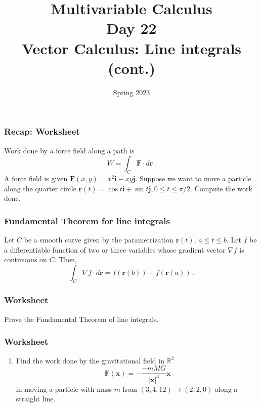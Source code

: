 \documentclass[aspectratio=169]{beamer}
\title{ Multivariable Calculus \\ Day  22 \\ Vector Calculus: Line integrals (cont.)}
\date{Spring 2023}
\newcommand{\vect}{\mathbf}
\newcommand{\R}{\mathbb{R}}
\begin{document}
\maketitle


\begin{frame}
    \frametitle{Recap: Worksheet}
    Work done by a force field along a path is 
    \begin{equation*}
        W = \int_C  \vect{F} \cdot d\vect{r} \,.
    \end{equation*}
    A force field is given $\vect{F}(x,y) = x^2 \vect{i} - xy \vect{j}$.
    Suppose we want to move a particle along the quarter circle
    $\vect{r}(t) = \cos t \vect{i} + \sin t \vect{j}, 0 \leq t \leq \pi/2$.
    Compute the work done.
\end{frame}



\begin{frame}
    \frametitle{Fundamental Theorem for line integrals}
    \begin{theorem}
    Let \(C\) be a smooth curve given by the parametrization \(\mathbf{r}(t)\),
    \(a \leq t \leq b\).
    Let \(f\) be a differentiable function of two or three
    variables whose gradient vector \(\nabla f\) is continuous on \(C\).
    Then,
    \begin{equation*}
        \int_C \nabla f \cdot d\mathbf{r} = f(\mathbf{r}(b)) - f(\mathbf{r}(a)) \,.
    \end{equation*}
    \end{theorem}

\end{frame}

\begin{frame}
    \frametitle{Worksheet}
    Prove the Fundamental Theorem of line integrals.
\end{frame}

\begin{frame}
    \frametitle{Worksheet}
    \begin{enumerate}
        \item Find the work done by the gravitational field in $\R^3$
            \begin{equation*}
                \vect{F}(\vect{x}) = - \frac{-mMG}{|\vect{x}|^3} \vect{x}
            \end{equation*}
            in moving a particle with mass $m$ from
            $(3,4,12) \to (2,2,0)$ along a straight line.
    \end{enumerate}
\end{frame}
\end{document}
